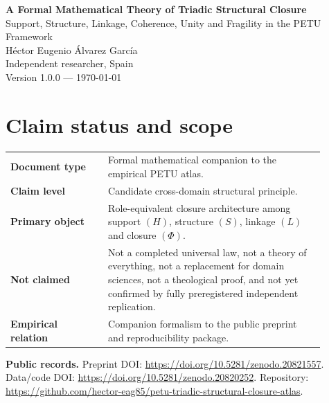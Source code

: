 \documentclass[11pt,a4paper]{article}
\begin{document}
\begin{center}
{\LARGE \textbf{A Formal Mathematical Theory of Triadic Structural Closure}}\\[0.4em]
{\large Support, Structure, Linkage, Coherence, Unity and Fragility in the PETU Framework}\\[0.7em]
Héctor Eugenio Álvarez García\\
Independent researcher, Spain\\
Version 1.0.0 --- \today
\end{center}

\section*{Claim status and scope}

\begin{center}
\begin{tabular}{p{0.28\linewidth}p{0.62\linewidth}}
\toprule
\textbf{Document type} & Formal mathematical companion to the empirical PETU atlas.\\
\textbf{Claim level} & Candidate cross-domain structural principle.\\
\textbf{Primary object} & Role-equivalent closure architecture among support $(H)$, structure $(S)$, linkage $(L)$ and closure $(\Phi)$.\\
\textbf{Not claimed} & Not a completed universal law, not a theory of everything, not a replacement for domain sciences, not a theological proof, and not yet confirmed by fully preregistered independent replication.\\
\textbf{Empirical relation} & Companion formalism to the public preprint and reproducibility package.\\
\bottomrule
\end{tabular}
\end{center}

\textbf{Public records.} Preprint DOI: \url{https://doi.org/10.5281/zenodo.20821557}.
Data/code DOI: \url{https://doi.org/10.5281/zenodo.20820252}.
Repository: \url{https://github.com/hector-eag85/petu-triadic-structural-closure-atlas}.
\end{document}

